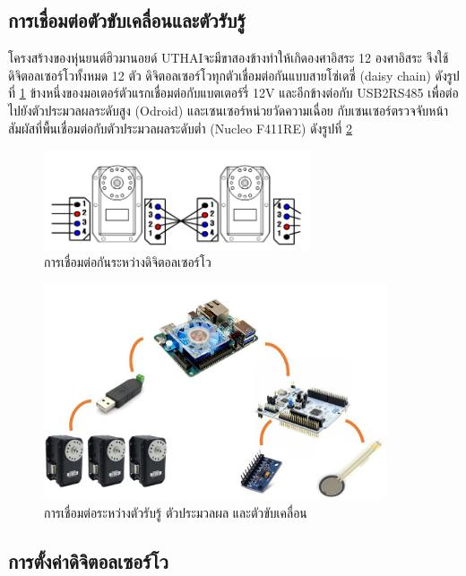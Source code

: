 \subsection{การเชื่อมต่อตัวขับเคลื่อนและตัวรับรู้}
โครงสร้างของหุ่นยนต์ฮิวมานอยด์ UTHAIจะมีขาสองข้างทำให้เกิดองศาอิสระ 12 องศาอิสระ
จึงใช้ดิจิตอลเซอร์โวทั้งหมด 12 ตัว ดิจิตอลเซอร์โวทุกตัวเชื่อมต่อกันแบบสายโซ่เดซี่ (daisy chain) ดังรูปที่ \ref{fig:dynamixel_connect}
ข้างหนึ่งของมอเตอร์ตัวแรกเชื่อมต่อกับแบตเตอร์รี่ 12V และอีกข้างต่อกับ USB2RS485 เพื่อต่อไปยังตัวประมวลผลระดับสูง (Odroid)
และเซนเซอร์หน่วยวัดความเฉื่อย กับเซนเซอร์ตรวจจับหน้าสัมผัสที่พื้นเชื่อมต่อกับตัวประมวลผลระดับต่ำ (Nucleo F411RE)
ดังรูปที่ \ref{fig:odroid2dynamixel}
\begin{figure}[!ht]
    \centering
    \includegraphics[width=0.7\textwidth]{chapter3/images/dynamixel_connect.png}
    \caption{การเชื่อมต่อกันระหว่างดิจิตอลเซอร์โว}
    \label{fig:dynamixel_connect}
\end{figure}
\begin{figure}[!ht]
    \centering
    \includegraphics[width=0.9\textwidth]{chapter3/images/odroid2dynamixel.JPG}
    \caption{การเชื่อมต่อระหว่างตัวรับรู้ ตัวประมวลผล และตัวขับเคลื่อน}
    \label{fig:odroid2dynamixel}
\end{figure}


\clearpage
\subsection{การตั้งค่าดิจิตอลเซอร์โว}

